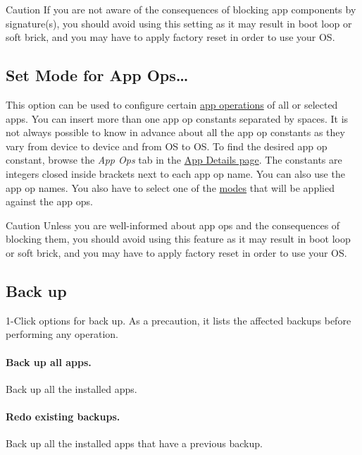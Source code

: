 \begin{danger}{Caution}
    If you are not aware of the consequences of blocking app components by signature(s), you should avoid using this
    setting as it may result in boot loop or soft brick, and you may have to apply factory reset in order to use your OS\@.
\end{danger}

\subsection{Set Mode for App Ops\dots}\label{subsec:set-mode-for-app-ops-dots}
This option can be used to configure certain \hyperref[ch:app-ops]{app operations} of all or selected apps.
You can insert more than one app op constants separated by spaces.
It is not always possible to know in advance about all the app op constants as they vary from device to device and from OS to OS\@.
To find the desired app op constant, browse the \textit{App Ops} tab in the \hyperref[sec:app-details-page]{App Details page}.
The constants are integers closed inside brackets next to each app op name.
You can also use the app op names.
You also have to select one of the \hyperref[subsec:mode-constants]{modes} that will be applied against the app ops.

\begin{danger}{Caution}
    Unless you are well-informed about app ops and the consequences of blocking them, you should avoid using this
    feature as it may result in boot loop or soft brick, and you may have to apply factory reset in order to use your OS\@.
\end{danger}

\subsection{Back up}\label{subsec:1-click-back-up}
1-Click options for back up.
As a precaution, it lists the affected backups before performing any operation.

\paragraph{Back up all apps.} Back up all the installed apps.

\paragraph{Redo existing backups.} Back up all the installed apps that have a previous backup.

